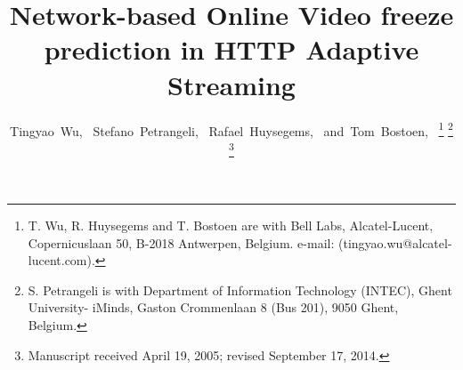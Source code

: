 \documentclass[journal]{IEEEtran}
\begin{document}
%
\title{Network-based Online Video freeze prediction in HTTP Adaptive Streaming}
%
%
%

\author{Tingyao~Wu,~
				Stefano~Petrangeli,~
        Rafael~Huysegems,~
        and~Tom~Bostoen,~%
\thanks{T. Wu, R. Huysegems and T. Bostoen are with Bell Labs, Alcatel-Lucent, Copernicuslaan 50, B-2018 Antwerpen, Belgium. e-mail: (tingyao.wu@alcatel-lucent.com).}%
\thanks{S. Petrangeli is with Department of Information
Technology (INTEC), Ghent University- iMinds, Gaston Crommenlaan
8 (Bus 201), 9050 Ghent, Belgium.}%
\thanks{Manuscript received April 19, 2005; revised September 17, 2014.}}

% 
%
\end{document}
